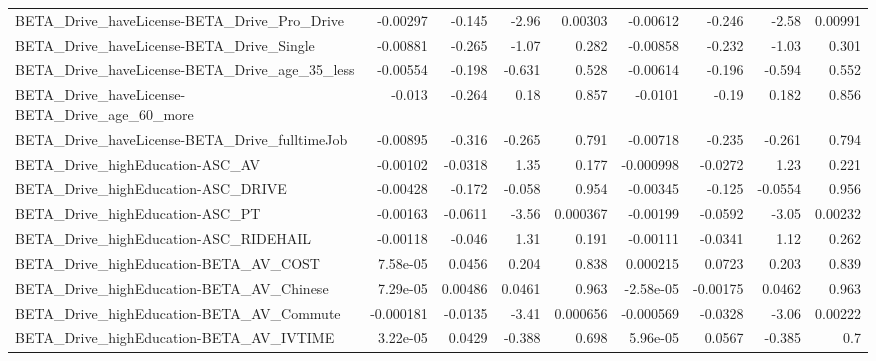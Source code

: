 \begin{tabular}{lrrrrrrrr}
BETA\_Drive\_haveLicense-BETA\_Drive\_Pro\_Drive        &    -0.00297 &       -0.145 &    -2.96 &  0.00303 &   -0.00612 &      -0.246 &        -2.58 &       0.00991 \\
BETA\_Drive\_haveLicense-BETA\_Drive\_Single           &    -0.00881 &       -0.265 &    -1.07 &    0.282 &   -0.00858 &      -0.232 &        -1.03 &         0.301 \\
BETA\_Drive\_haveLicense-BETA\_Drive\_age\_35\_less      &    -0.00554 &       -0.198 &   -0.631 &    0.528 &   -0.00614 &      -0.196 &       -0.594 &         0.552 \\
BETA\_Drive\_haveLicense-BETA\_Drive\_age\_60\_more      &      -0.013 &       -0.264 &     0.18 &    0.857 &    -0.0101 &       -0.19 &        0.182 &         0.856 \\
BETA\_Drive\_haveLicense-BETA\_Drive\_fulltimeJob      &    -0.00895 &       -0.316 &   -0.265 &    0.791 &   -0.00718 &      -0.235 &       -0.261 &         0.794 \\
BETA\_Drive\_highEducation-ASC\_AV                    &    -0.00102 &      -0.0318 &     1.35 &    0.177 &  -0.000998 &     -0.0272 &         1.23 &         0.221 \\
BETA\_Drive\_highEducation-ASC\_DRIVE                 &    -0.00428 &       -0.172 &   -0.058 &    0.954 &   -0.00345 &      -0.125 &      -0.0554 &         0.956 \\
BETA\_Drive\_highEducation-ASC\_PT                    &    -0.00163 &      -0.0611 &    -3.56 & 0.000367 &   -0.00199 &     -0.0592 &        -3.05 &       0.00232 \\
BETA\_Drive\_highEducation-ASC\_RIDEHAIL              &    -0.00118 &       -0.046 &     1.31 &    0.191 &   -0.00111 &     -0.0341 &         1.12 &         0.262 \\
BETA\_Drive\_highEducation-BETA\_AV\_COST              &    7.58e-05 &       0.0456 &    0.204 &    0.838 &   0.000215 &      0.0723 &        0.203 &         0.839 \\
BETA\_Drive\_highEducation-BETA\_AV\_Chinese           &    7.29e-05 &      0.00486 &   0.0461 &    0.963 &  -2.58e-05 &    -0.00175 &       0.0462 &         0.963 \\
BETA\_Drive\_highEducation-BETA\_AV\_Commute           &   -0.000181 &      -0.0135 &    -3.41 & 0.000656 &  -0.000569 &     -0.0328 &        -3.06 &       0.00222 \\
BETA\_Drive\_highEducation-BETA\_AV\_IVTIME            &    3.22e-05 &       0.0429 &   -0.388 &    0.698 &   5.96e-05 &      0.0567 &       -0.385 &           0.7 \\

\end{tabular}
